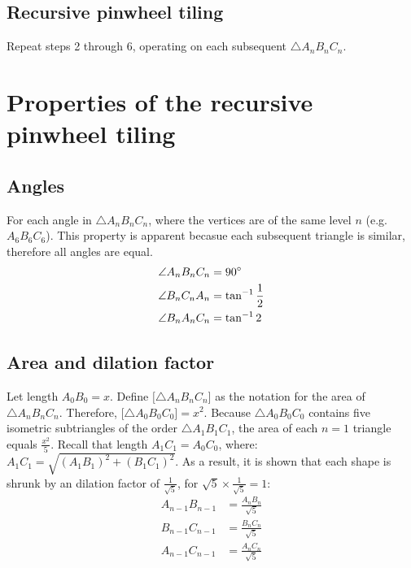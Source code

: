 

\subsection{Recursive pinwheel tiling}
Repeat steps 2 through 6, operating on each subsequent $\triangle A_{n}B_{n}C_{n}$.


\newpage



\section{Properties of the recursive pinwheel tiling}
\subsection{Angles}
For each angle in $\triangle A_{n}B_{n}C_{n}$, where the vertices are of the same level $n$ (e.g. \angle $A_{6}B_{6}C_{6}$). This property is apparent becasue each subsequent triangle is similar, therefore all angles are equal.
\begin{equation}
    \begin{aligned}
        \angle A_{n}B_{n}C_{n} &= 90\degree \\
        \angle B_{n}C_{n}A_{n} &= \tan^{-1}\frac{1}{2} \\
        \angle B_{n}A_{n}C_{n} &= \tan^{-1}2
    \end{aligned}
\end{equation}

\subsection{Area and dilation factor}
Let length $A_{0}B_{0} = x$. Define $\big[\triangle A_{n}B_{n}C_{n}\big]$ as the notation for the area of $\triangle A_{n}B_{n}C_{n}$. Therefore, $\big[\triangle A_{0}B_{0}C_{0}\big] = x^2$. Because $\triangle A_{0}B_{0}C_{0}$ contains five isometric subtriangles of the order $\triangle A_{1}B_{1}C_{1}$, the area of each $n = 1$ triangle equals $\frac{x^2}{5}$. Recall that length $A_{1}C_{1} = A_{0}C_{0}$, where: $A_{1}C_{1} = \sqrt{(A_{1}B_{1})^2 + (B_{1}C_{1})^2}$. As a result, it is shown that each shape is shrunk by an dilation factor of $\frac{1}{\sqrt{5}}$, for $\sqrt{5} \times \frac{1}{\sqrt{5}} = 1$:
\begin{equation}
    \begin{aligned}
        A_{n-1}B_{n-1} &= \frac{A_{n}B_{n}}{\sqrt{5}} \\
        B_{n-1}C_{n-1} &= \frac{B_{n}C_{n}}{\sqrt{5}} \\
        A_{n-1}C_{n-1} &= \frac{A_{n}C_{n}}{\sqrt{5}}
    \end{aligned}
\end{equation}

